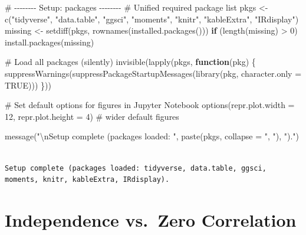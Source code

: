 \documentclass[
  12pt,
  letterpaper,
]{scrbook}
\newenvironment{Shaded}{\begin{snugshade}}{\end{snugshade}}
\newcommand{\AttributeTok}[1]{\textcolor[rgb]{0.40,0.45,0.13}{#1}}
\newcommand{\CommentTok}[1]{\textcolor[rgb]{0.37,0.37,0.37}{#1}}
\newcommand{\ConstantTok}[1]{\textcolor[rgb]{0.56,0.35,0.01}{#1}}
\newcommand{\ControlFlowTok}[1]{\textcolor[rgb]{0.00,0.23,0.31}{\textbf{#1}}}
\newcommand{\DecValTok}[1]{\textcolor[rgb]{0.68,0.00,0.00}{#1}}
\newcommand{\FunctionTok}[1]{\textcolor[rgb]{0.28,0.35,0.67}{#1}}
\newcommand{\NormalTok}[1]{\textcolor[rgb]{0.00,0.23,0.31}{#1}}
\newcommand{\OtherTok}[1]{\textcolor[rgb]{0.00,0.23,0.31}{#1}}
\newcommand{\SpecialCharTok}[1]{\textcolor[rgb]{0.37,0.37,0.37}{#1}}
\newcommand{\StringTok}[1]{\textcolor[rgb]{0.13,0.47,0.30}{#1}}
\theoremstyle{plain}
\theoremstyle{definition}
\theoremstyle{remark}
\begin{document}
\begin{Shaded}
\begin{Highlighting}[]
\CommentTok{\# {-}{-}{-}{-}{-}{-}{-}{-} Setup: packages {-}{-}{-}{-}{-}{-}{-}{-}}
\CommentTok{\# Unified required package list}
\NormalTok{pkgs }\OtherTok{\textless{}{-}} \FunctionTok{c}\NormalTok{(}\StringTok{"tidyverse"}\NormalTok{, }\StringTok{"data.table"}\NormalTok{, }\StringTok{"ggsci"}\NormalTok{, }\StringTok{"moments"}\NormalTok{, }\StringTok{"knitr"}\NormalTok{, }\StringTok{"kableExtra"}\NormalTok{, }\StringTok{"IRdisplay"}\NormalTok{)}
\NormalTok{missing }\OtherTok{\textless{}{-}} \FunctionTok{setdiff}\NormalTok{(pkgs, }\FunctionTok{rownames}\NormalTok{(}\FunctionTok{installed.packages}\NormalTok{()))}
\ControlFlowTok{if}\NormalTok{ (}\FunctionTok{length}\NormalTok{(missing) }\SpecialCharTok{\textgreater{}} \DecValTok{0}\NormalTok{) }\FunctionTok{install.packages}\NormalTok{(missing)}

\CommentTok{\# Load all packages (silently)}
\FunctionTok{invisible}\NormalTok{(}\FunctionTok{lapply}\NormalTok{(pkgs, }\ControlFlowTok{function}\NormalTok{(pkg) \{}
  \FunctionTok{suppressWarnings}\NormalTok{(}\FunctionTok{suppressPackageStartupMessages}\NormalTok{(}\FunctionTok{library}\NormalTok{(pkg, }\AttributeTok{character.only =} \ConstantTok{TRUE}\NormalTok{)))}
\NormalTok{\}))}

\CommentTok{\# Set default options for figures in Jupyter Notebook}
\FunctionTok{options}\NormalTok{(}\AttributeTok{repr.plot.width =} \DecValTok{12}\NormalTok{, }\AttributeTok{repr.plot.height =} \DecValTok{4}\NormalTok{)  }\CommentTok{\# wider default figures}

\FunctionTok{message}\NormalTok{(}\StringTok{"}\SpecialCharTok{\textbackslash{}n}\StringTok{Setup complete (packages loaded: "}\NormalTok{, }\FunctionTok{paste}\NormalTok{(pkgs, }\AttributeTok{collapse =} \StringTok{", "}\NormalTok{), }\StringTok{")."}\NormalTok{)}
\end{Highlighting}
\end{Shaded}

\begin{verbatim}

Setup complete (packages loaded: tidyverse, data.table, ggsci, moments, knitr, kableExtra, IRdisplay).
\end{verbatim}

\section{Independence vs.~Zero
Correlation}\label{independence-vs.-zero-correlation}
\end{document}
